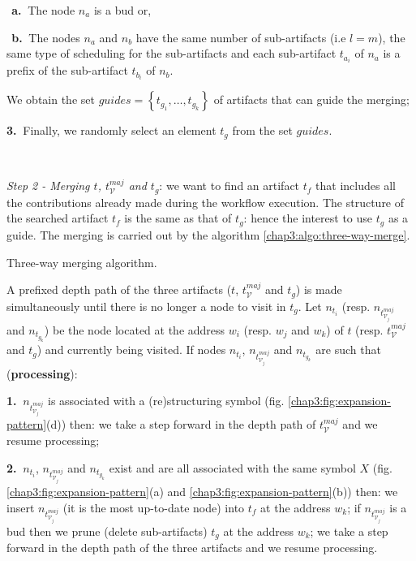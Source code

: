 {\begin{algorithm}
\begin{mdframed}[style=MyFrame]
		$~~$\textbf{a.}$~$ The node $n_a$ is a bud or,
		
		$~~$\textbf{b.}$~$ The nodes $n_a$ and $n_b$ have the same number of sub-artifacts (i.e $l=m$), the same type of scheduling for the sub-artifacts and each sub-artifact $t_{a_i}$ of $n_a$ is a prefix of the sub-artifact $t_{b_i}$ of $n_b$.
	
	\noindent We obtain the set $guides=\left\{t_{g_1},\ldots,t_{g_k}\right\}$ of artifacts that can guide the merging;
	
	\noindent\textbf{3.}$~$ Finally, we randomly select an element $t_g$ from the set $guides$.
\end{mdframed}
\end{algorithm}


~

\noindent\textit{Step 2 - Merging $t$, $t_{\mathcal{V}}^{maj}$ and $t_g$}:
we want to find an artifact $t_f$ that includes all the contributions already made during the workflow execution. The structure of the searched artifact $t_f$ is the same as that of $t_g$: hence the interest to use $t_g$ as a guide. The merging is carried out by the algorithm \ref{chap3:algo:three-way-merge}.

\begin{algorithm}
\small
\caption{Three-way merging algorithm.}
\label{chap3:algo:three-way-merge}
\begin{mdframed}[style=MyFrame]
	\noindent A prefixed depth path of the three artifacts ($t$, $t_{\mathcal{V}}^{maj}$ and $t_g$) is made simultaneously until there is no longer a node to visit in $t_g$. Let $n_{t_i}$ (resp. $n_{t_{\mathcal{V}_j}^{maj}}$ and $n_{t_{g_k}}$) be the node located at the address $w_i$ (resp. $w_j$ and $w_k$) of $t$ (resp. $t_{\mathcal{V}}^{maj}$ and $t_g$) and currently being visited. If nodes $n_{t_i}$, $n_{t_{\mathcal{V}_j}^{maj}}$ and $n_{t_{g_k}}$ are such that (\textbf{processing}):
	
	\noindent\textbf{1.}$~$ $n_{t_{\mathcal{V}_j}^{maj}}$ is associated with a (re)structuring symbol (fig. \ref{chap3:fig:expansion-pattern}(d)) then: we take a step forward in the depth path of $t_{\mathcal{V}}^{maj}$ and we resume processing;
	
	\noindent\textbf{2.}$~$ $n_{t_i}$, $n_{t_{\mathcal{V}_j}^{maj}}$ and $n_{t_{g_k}}$ exist and are all associated with the same symbol $X$ (fig. \ref{chap3:fig:expansion-pattern}(a) and \ref{chap3:fig:expansion-pattern}(b)) then:
	we insert $n_{t_{\mathcal{V}_j}^{maj}}$ (it is the most up-to-date node) into $t_f$ at the address $w_k$; 
	if $n_{t_{\mathcal{V}_j}^{maj}}$ is a bud then we prune (delete sub-artifacts) $t_g$ at the address $w_k$; 
	we take a step forward in the depth path of the three artifacts and we resume processing.
	

\end{mdframed}
\end{algorithm}}
